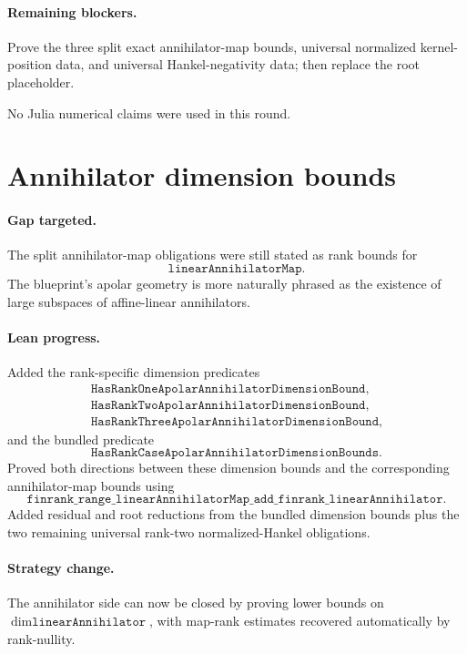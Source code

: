 \documentclass[11pt]{article}
\begin{document}
\paragraph{Remaining blockers.}
Prove the three split exact annihilator-map bounds, universal normalized
kernel-position data, and universal Hankel-negativity data; then replace the
root placeholder.

No Julia numerical claims were used in this round.

\section*{Annihilator dimension bounds}

\paragraph{Gap targeted.}
The split annihilator-map obligations were still stated as rank bounds for
\[
\texttt{linearAnnihilatorMap}.
\]
The blueprint's apolar geometry is more naturally phrased as the existence of
large subspaces of affine-linear annihilators.

\paragraph{Lean progress.}
Added the rank-specific dimension predicates
\[
\begin{gathered}
\texttt{HasRankOneApolarAnnihilatorDimensionBound},\\
\texttt{HasRankTwoApolarAnnihilatorDimensionBound},\\
\texttt{HasRankThreeApolarAnnihilatorDimensionBound},
\end{gathered}
\]
and the bundled predicate
\[
\texttt{HasRankCaseApolarAnnihilatorDimensionBounds}.
\]
Proved both directions between these dimension bounds and the corresponding
annihilator-map bounds using
\[
\texttt{finrank\_range\_linearAnnihilatorMap\_add\_finrank\_linearAnnihilator}.
\]
Added residual and root reductions from the bundled dimension bounds plus the
two remaining universal rank-two normalized-Hankel obligations.

\paragraph{Strategy change.}
The annihilator side can now be closed by proving lower bounds on
\(\dim \texttt{linearAnnihilator}\), with map-rank estimates recovered
automatically by rank-nullity.
\end{document}
